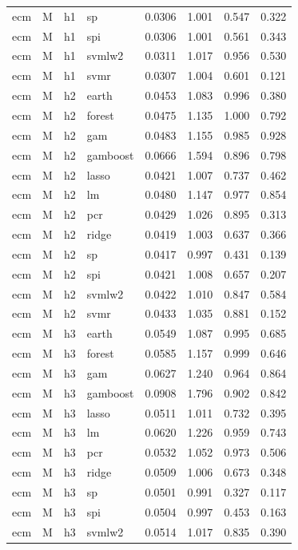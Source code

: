 \begin{ThreePartTable}
\begin{longtable}[t]{llclcccc}
ecm & M & h1 & sp & 0.0306 & 1.001 & 0.547 & 0.322\\
ecm & M & h1 & spi & 0.0306 & 1.001 & 0.561 & 0.343\\
ecm & M & h1 & svmlw2 & 0.0311 & 1.017 & 0.956 & 0.530\\
ecm & M & h1 & svmr & 0.0307 & 1.004 & 0.601 & 0.121\\
\addlinespace
ecm & M & h2 & earth & 0.0453 & 1.083 & 0.996 & 0.380\\
ecm & M & h2 & forest & 0.0475 & 1.135 & 1.000 & 0.792\\
ecm & M & h2 & gam & 0.0483 & 1.155 & 0.985 & 0.928\\
ecm & M & h2 & gamboost & 0.0666 & 1.594 & 0.896 & 0.798\\
ecm & M & h2 & lasso & 0.0421 & 1.007 & 0.737 & 0.462\\
ecm & M & h2 & lm & 0.0480 & 1.147 & 0.977 & 0.854\\
ecm & M & h2 & pcr & 0.0429 & 1.026 & 0.895 & 0.313\\
ecm & M & h2 & ridge & 0.0419 & 1.003 & 0.637 & 0.366\\
ecm & M & h2 & sp & 0.0417 & 0.997 & 0.431 & 0.139\\
ecm & M & h2 & spi & 0.0421 & 1.008 & 0.657 & 0.207\\
ecm & M & h2 & svmlw2 & 0.0422 & 1.010 & 0.847 & 0.584\\
ecm & M & h2 & svmr & 0.0433 & 1.035 & 0.881 & 0.152\\
\addlinespace
ecm & M & h3 & earth & 0.0549 & 1.087 & 0.995 & 0.685\\
ecm & M & h3 & forest & 0.0585 & 1.157 & 0.999 & 0.646\\
ecm & M & h3 & gam & 0.0627 & 1.240 & 0.964 & 0.864\\
ecm & M & h3 & gamboost & 0.0908 & 1.796 & 0.902 & 0.842\\
ecm & M & h3 & lasso & 0.0511 & 1.011 & 0.732 & 0.395\\
ecm & M & h3 & lm & 0.0620 & 1.226 & 0.959 & 0.743\\
ecm & M & h3 & pcr & 0.0532 & 1.052 & 0.973 & 0.506\\
ecm & M & h3 & ridge & 0.0509 & 1.006 & 0.673 & 0.348\\
ecm & M & h3 & sp & 0.0501 & 0.991 & 0.327 & 0.117\\
ecm & M & h3 & spi & 0.0504 & 0.997 & 0.453 & 0.163\\
ecm & M & h3 & svmlw2 & 0.0514 & 1.017 & 0.835 & 0.390\\

\end{longtable}
\end{ThreePartTable}
